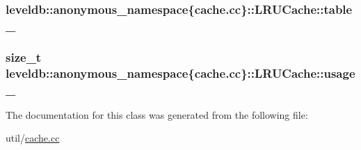\subsubsection[{table\+\_\+}]{ leveldb\+::anonymous\+\_\+namespace\{cache.\+cc\}\+::L\+R\+U\+Cache\+::table\+\_\+\hspace{0.3cm}{\ttfamily [private]}}\label{classleveldb_1_1anonymous__namespace_02cache_8cc_03_1_1_l_r_u_cache_a229a9161c1b6b719b9a4c99572a49ae9}
\hypertarget{classleveldb_1_1anonymous__namespace_02cache_8cc_03_1_1_l_r_u_cache_a241e9760171e0d9c991fee2be57b555c}{}
\subsubsection[{usage\+\_\+}]{\setlength{\rightskip}{0pt plus 5cm}size\+\_\+t leveldb\+::anonymous\+\_\+namespace\{cache.\+cc\}\+::L\+R\+U\+Cache\+::usage\+\_\+\hspace{0.3cm}{\ttfamily [private]}}\label{classleveldb_1_1anonymous__namespace_02cache_8cc_03_1_1_l_r_u_cache_a241e9760171e0d9c991fee2be57b555c}


The documentation for this class was generated from the following file\+:\begin{DoxyCompactItemize}
\item 
util/\hyperlink{cache_8cc}{cache.\+cc}\end{DoxyCompactItemize}
